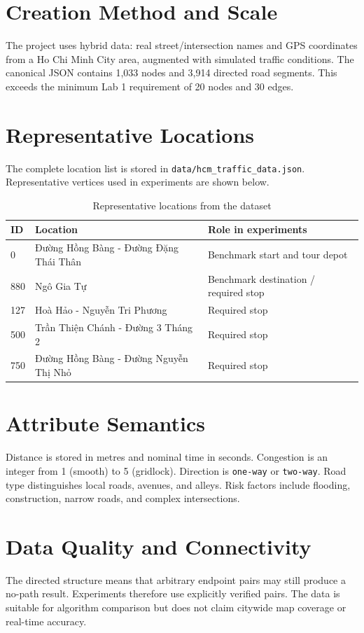 \documentclass[12pt,a4paper,oneside]{report}
\newcommand{\code}[1]{\texttt{#1}}
\begin{document}
\section{Creation Method and Scale}
The project uses hybrid data: real street/intersection names and GPS coordinates
from a Ho Chi Minh City area, augmented with simulated traffic conditions. The
canonical JSON contains 1,033 nodes and 3,914 directed road segments. This
exceeds the minimum Lab 1 requirement of 20 nodes and 30 edges.

\section{Representative Locations}
The complete location list is stored in \code{data/hcm\_traffic\_data.json}. Representative
vertices used in experiments are shown below.

\begin{table}[H]
\centering
\caption{Representative locations from the dataset}
\label{tab:locations}
\small
\begin{tabularx}{\textwidth}{p{1.5cm}Xl}
\toprule
\textbf{ID} & \textbf{Location} & \textbf{Role in experiments}\\
\midrule
0 & Đường Hồng Bàng - Đường Đặng Thái Thân & Benchmark start and tour depot\\
880 & Ngô Gia Tự & Benchmark destination / required stop\\
127 & Hoà Hảo - Nguyễn Tri Phương & Required stop\\
500 & Trần Thiện Chánh - Đường 3 Tháng 2 & Required stop\\
750 & Đường Hồng Bàng - Đường Nguyễn Thị Nhỏ & Required stop\\
\bottomrule
\end{tabularx}
\end{table}

\section{Attribute Semantics}
Distance is stored in metres and nominal time in seconds. Congestion is an
integer from 1 (smooth) to 5 (gridlock). Direction is \code{one-way} or
\code{two-way}. Road type distinguishes local roads, avenues, and alleys. Risk
factors include flooding, construction, narrow roads, and complex intersections.

\section{Data Quality and Connectivity}
The directed structure means that arbitrary endpoint pairs may still produce a
no-path result. Experiments therefore use explicitly verified pairs. The data
is suitable for algorithm comparison but does not claim citywide map
coverage or real-time accuracy.
\end{document}
